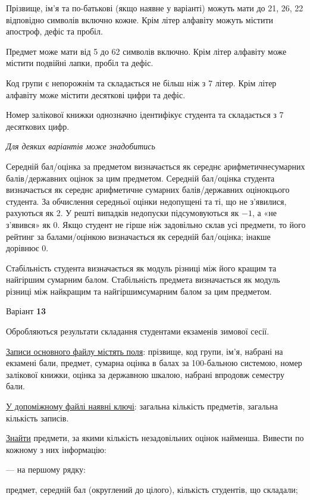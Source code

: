 \documentclass[11pt, ukrainian]{article}
\begin{document}
Прізвище, ім’я та по-батькові (якщо наявне у варіанті) можуть мати до 21, 26, 22 відповідно символів включно кожне. 
Крім літер алфавіту можуть містити апостроф, дефіс та пробіл.

Предмет може мати від 5 до 62 символів включно. 
Крім літер алфавіту може містити подвійні лапки, пробіл та дефіс.

Код групи є непорожнім та складається не більш ніж з 7 літер. 
Крім літер алфавіту може містити десяткові цифри та дефіс.


Номер залікової книжки однозначно ідентифікує студента та складається з 7 десяткових цифр. 

\bigskip\textit{Для деяких варіантів може знадобитись}

Середній бал/оцінка за предметом визначається як середнє арифметичнесумарних балів/державних оцінок за цим предметом. 
Середній бал/оцінка студента визначається як середнє арифметичне сумарних балів/державних оцінокцього студента. 
За обчислення середньої оцінки недопущені та ті, що не з’явилися, рахуються як 2.
У решті випадків недопуски підсумовуються як $-1$, а «не з’явився» як 0.
Якщо студент не гірше ніж задовільно склав усі предмети, 
то його рейтинг за балами/оцінкою визначається як середній бал/оцінка; інакше дорівнює 0.

Стабільність студента визначається як модуль різниці між його кращим та найгіршим сумарним балом.
Стабільність предмета визначається як модуль різниці між найкращим та найгіршимсумарним балом за цим предметом.




\par
\newpage
{\center Варіант  \No \textbf { 13 }\par}
\bigskip
Обробляються результати складання студентами екзаменів зимової сесії.

\underline{Записи основного файлу містять поля}: прізвище, код групи, ім’я, набрані на екзамені бали, предмет, сумарна оцінка в балах за 100-бальною системою, номер залікової книжки, оцінка за державною шкалою, набрані впродовж семестру бали.

\underline{У допоміжному файлі наявні ключі}: загальна кількість предметів, загальна кількість записів.

\underline{Знайти} предмети, за якими кількість незадовільних оцінок найменша. Вивести по кожному з них інформацію:\par
{\noindent}--- на першому рядку:\par
предмет, середній бал (округлений до цілого), кількість студентів, що складали;
\end{document}
